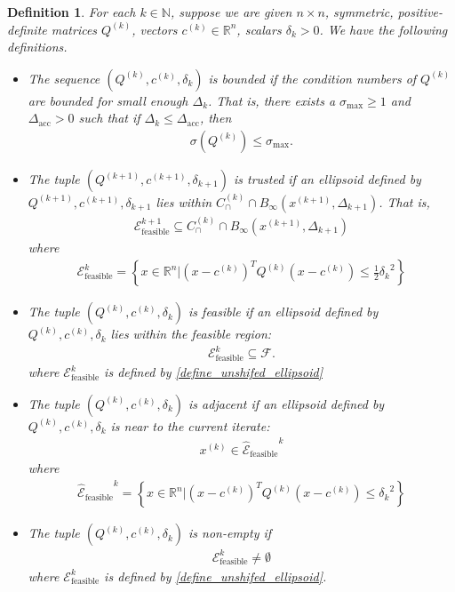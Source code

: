 \documentclass{article}
\newtheorem{definition}[theorem]{Definition}
\theoremstyle{case}
\numberwithin{theorem}{subsection}
\newcommand{\capcones}{{C^{(k)}_{\cap}}}
\newcommand{\ck}{{c^{(k)}}}
\newcommand{\dacc}{{\Delta_{\textrm{acc}}}}
\newcommand{\dk}{\Delta_k}
\newcommand{\dkpo}{\Delta_{k+1}}
\newcommand{\feasible}{{\mathcal F}}
\newcommand{\naturals}{\mathbb N}
\newcommand{\qk}{{Q^{(k)}}}
\newcommand{\Rn}{\mathbb R^n}
\newcommand{\scaledunshiftedellipsoid}{{{\mathcal {\hat E}_{\text{feasible}}}^k}}
\newcommand{\sdk}{{\delta_k}}
\newcommand{\sigmamax}{{\sigma_{\textrm{max}}}}
\newcommand{\trkpo}{{ B_{\infty}\left(\xkpo, \dkpo\right) }}
\newcommand{\unshiftedellipsoid}{{\mathcal E^k_{\textrm{feasible}}}}
\newcommand{\xkpo}{{{x}^{(k+1)}}}
\newcommand{\xk}{x^{(k)}}
\newcommand{\qkpo}{{Q^{(k+1)}}}
\newcommand{\ckpo}{{c^{(k+1)}}}
\newcommand{\sdkpo}{{\delta_{k+1}}}
\newcommand{\unshiftedellipsoidkpo}{{\mathcal E^{k+1}_{\textrm{feasible}}}}
\begin{document}
\begin{definition}
\label{ellipsoids_notation_definitions}
For each $k \in \naturals$, suppose we are given $n\times n$, symmetric, positive-definite matrices $\qk$, vectors $\ck \in \Rn$, scalars $\sdk > 0$.
We have the following definitions.
\begin{itemize}
\item The sequence $(\qk, \ck, \sdk)$ is \emph{bounded} if the condition numbers of $\qk$ are bounded for small enough $\dk$.
That is, there exists a $\sigmamax \ge 1$ and $\dacc > 0$ such that if $\dk \le \dacc$, then
\begin{align}
\sigma\left(Q^{(k)}\right) \le \sigmamax. \label{define_suitable_condition_numbers}
\end{align}
\item The tuple $(\qkpo, \ckpo, \sdkpo)$ is \emph{trusted} if an ellipsoid defined by $\qkpo, \ckpo, \sdkpo$ lies within $ \capcones \cap \trkpo $.
That is,
\begin{align}
\unshiftedellipsoidkpo \subseteq \capcones \cap \trkpo  \label{define_suitable_in_tr}
\end{align}
where
\begin{align}
\unshiftedellipsoid = \left\{x \in \Rn | \left(x - \ck \right)^T \qk \left(x - \ck\right) \le \frac 1 2 {\sdk}^2 \right\} \label{define_unshifed_ellipsoid}
\end{align}
\item The tuple $(\qk, \ck, \sdk)$ is \emph{feasible} if an ellipsoid defined by $\qk, \ck, \sdk$ lies within the feasible region:
\begin{align}
\unshiftedellipsoid \subseteq \feasible.
\end{align}
where $\unshiftedellipsoid$ is defined by \cref{define_unshifed_ellipsoid}
\item The tuple $(\qk, \ck, \sdk)$ is \emph{adjacent} if an ellipsoid defined by $\qk, \ck, \sdk$ is near to the current iterate:
\begin{align}
\xk \in \scaledunshiftedellipsoid \label{define_suitable_close_to_iterate}
\end{align}
where
\begin{align}
\scaledunshiftedellipsoid = \left\{x \in \Rn | \left(x - \ck\right)^T \qk \left(x - \ck\right) \le {\sdk}^2 \right\} \label{define_scaledunshiftedellipsoid}
\end{align}
\item The tuple $(\qk, \ck, \sdk)$ is \emph{non-empty} if
\begin{align}
\unshiftedellipsoid \ne \emptyset
\end{align}
where $\unshiftedellipsoid$ is defined by \cref{define_unshifed_ellipsoid}.
\end{itemize}
\end{definition}
\end{document}
